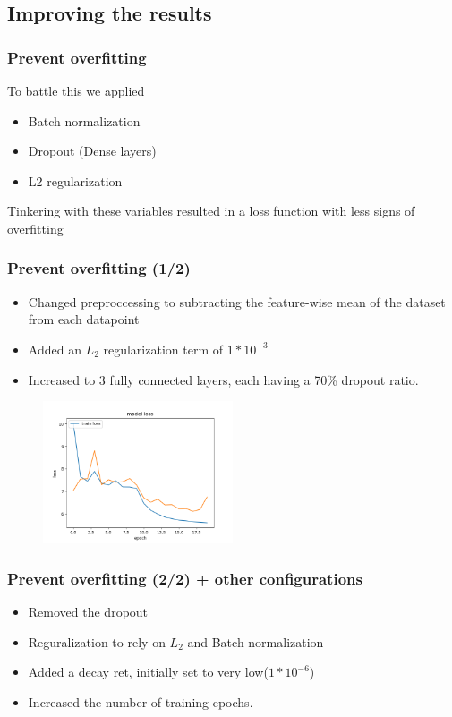 \documentclass{beamer}
\begin{document}
\subsection{Improving the results}
\begin{frame}
  \frametitle{Prevent overfitting}
  To battle this we applied
  \begin{itemize}
    \item Batch normalization
    \item Dropout (Dense layers)
    \item L2 regularization
  \end{itemize}
  Tinkering with these variables resulted in a loss function with less signs of overfitting
\end{frame}

\begin{frame}
  \frametitle{Prevent overfitting (1/2)}
  \begin{itemize}
    \item  Changed preproccessing to subtracting the feature-wise mean of the dataset from each datapoint
    \item Added an $L_{2}$ regularization term of $1*10^{-3}$
    \item Increased to 3 fully connected layers, each having a 70\% dropout ratio.
  \end{itemize}
  \begin{figure}[!h]
  \centering
  \includegraphics[width=0.5\textwidth]{images/improved_loss_1.png}
  \end{figure}
\end{frame}


\begin{frame}
  \frametitle{Prevent overfitting (2/2) + other configurations}
  \begin{itemize}
    \item Removed the dropout
    \item Reguralization to rely on $L_{2}$ and Batch normalization
    \item Added a decay ret, initially set to very low($1*10^{-6}$)
    \item Increased the number of training epochs.
  \end{itemize}
\end{frame}
\end{document}
